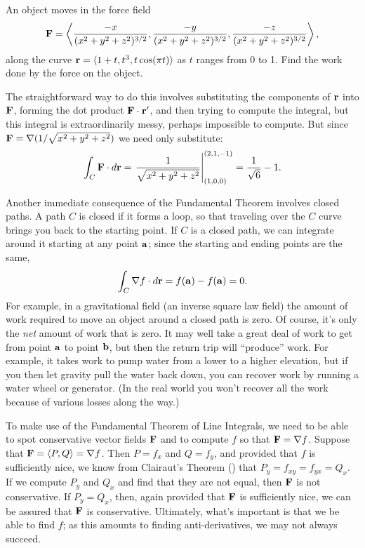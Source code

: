 \begin{theorem}
\begin{example}
An object moves in the force field 
$${\bf F}=
\left
\langle {-x\over (x^2+y^2+z^2)^{3/2}},{-y\over (x^2+y^2+z^2)^{3/2}},{-z\over
  (x^2+y^2+z^2)^{3/2}}\right\rangle,$$
along the curve ${\bf r}=\langle 1+t,t^3,t\cos(\pi t)\rangle$ as $t$
ranges from 0 to 1. Find the work done by the force on the object.

The straightforward way to do this involves substituting the
components of ${\bf r}$ into $\bf F$, forming the dot product ${\bf
  F}\cdot{\bf r}'$, and then trying to compute the integral, but this
integral is extraordinarily messy, perhaps impossible to compute. But
since ${\bf F}=\nabla (1/\sqrt{x^2+y^2+z^2})$ we need only substitute:
$$\int_C {\bf F}\cdot d{\bf r}=
\left.{1\over \sqrt{x^2+y^2+z^2}}\right|_{(1,0,0)}^{(2,1,-1)}=
{1\over\sqrt6}-1.
$$
\end{example}

Another immediate consequence of the Fundamental Theorem involves
{\dfont closed paths}. A path $C$ is closed if it
forms a loop, so that traveling over the $C$ curve brings you back to
the starting point. If $C$ is a closed path, we can integrate around
it starting at any point $\bf a$; since the starting and ending points are the
same,
$$\int_C \nabla f\cdot d{\bf r}=f({\bf a})-f({\bf a})=0.$$
For example, in a gravitational field (an inverse square law field)
the amount of work required to move an object around a closed path is
zero. Of course, it's only the {\it net\/} amount of work that is
zero. It may well take a great deal of work to get from point $\bf a$
to point $\bf b$, but then the return trip will ``produce'' work. For
example, it takes work to pump water from a lower to a higher elevation,
but if you then let gravity pull the water back down, you can recover
work by running a water wheel or generator. (In the real world you
won't recover all the work because of various losses along the way.)

To make use of the Fundamental Theorem of Line Integrals, we need to
be able to spot conservative vector fields $\bf F$ and to compute 
$f$ so that ${\bf F}=\nabla f$. Suppose that ${\bf F}=\langle
P,Q\rangle = \nabla f$. Then $P=f_x$ and $Q=f_y$, and provided that
$f$ is sufficiently nice, we know from Clairaut's Theorem
() that $P_y=f_{xy}=f_{yx}=Q_x$. If we compute
$P_y$ and $Q_x$ and find that they are not equal, then $\bf F$ is not
conservative. If $P_y=Q_x$, then, again provided that $\bf F$ is
sufficiently nice, we can be assured that $\bf F$ is conservative.
Ultimately, what's important is that we be able to find $f$; as this
amounts to finding anti-derivatives, we may not always succeed.


\end{theorem}
